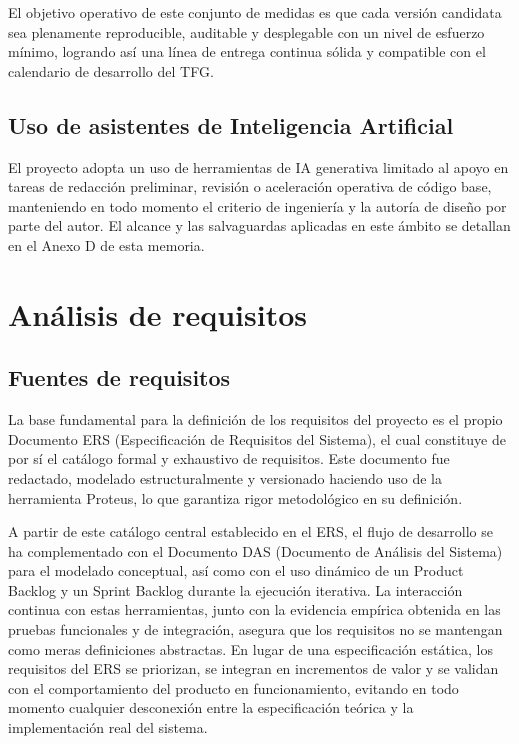 
El objetivo operativo de este conjunto de medidas es que cada versi\'on candidata sea plenamente reproducible, auditable y desplegable con un nivel de esfuerzo m\'inimo, logrando as\'i una l\'inea de entrega continua s\'olida y compatible con el calendario de desarrollo del TFG.

\subsection{Uso de asistentes de Inteligencia Artificial}

El proyecto adopta un uso de herramientas de IA generativa
limitado al apoyo en tareas de redacci\'on preliminar,
revisi\'on o aceleraci\'on operativa de c\'odigo base,
manteniendo en todo momento el criterio de ingenier\'ia y la autor\'ia de dise\~no por parte del autor.
El alcance y las salvaguardas aplicadas en este \'ambito se detallan
en el Anexo D de esta memoria.

\FloatBarrier
\section{An\'alisis de requisitos}

\subsection{Fuentes de requisitos}

La base fundamental para la definici\'on de los requisitos del proyecto es el propio Documento ERS (Especificaci\'on de Requisitos del Sistema), el cual constituye de por s\'i el cat\'alogo formal y exhaustivo de requisitos. Este documento fue redactado, modelado estructuralmente y versionado haciendo uso de la herramienta Proteus, lo que garantiza rigor metodol\'ogico en su definici\'on.

A partir de este cat\'alogo central establecido en el ERS, el flujo de desarrollo se ha complementado con el Documento DAS (Documento de An\'alisis del Sistema) para el modelado conceptual, as\'i como con el uso din\'amico de un Product Backlog y un Sprint Backlog durante la ejecuci\'on iterativa. La interacci\'on continua con estas herramientas, junto con la evidencia emp\'irica obtenida en las pruebas funcionales y de integraci\'on, asegura que los requisitos no se mantengan como meras definiciones abstractas. En lugar de una especificaci\'on est\'atica, los requisitos del ERS se priorizan, se integran en incrementos de valor y se validan con el comportamiento del producto en funcionamiento, evitando en todo momento cualquier desconexi\'on entre la especificaci\'on te\'orica y la implementaci\'on real del sistema.

